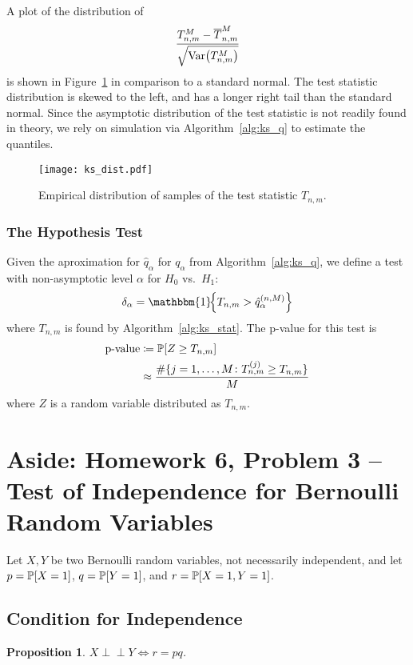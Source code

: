 \documentclass[letterpaper, reqno]{amsart}
\newtheorem{prop}{Proposition}[section]
\numberwithin{equation}{section}
\newcommand{\Prob}[1]{\mathbb{P}\mleft[#1\mright]}
\newcommand{\Var}[1]{\operatorname{Var}\mleft(#1\mright)}
\newcommand{\indep}{\perp \!\!\! \perp}  %
\newcommand{\indic}[1]{\mathbbm{1}\!\mleft\{#1\mright\}} %
\begin{document}
A plot of the distribution of 
\[ \frac{T_{n,m}^M - \overline{T}_{n,m}^M}{\sqrt{\Var{T_{n,m}^M}}} \]
is shown in Figure~\ref{fig:Tnm} in comparison to a standard normal. The test
statistic distribution is skewed to the left, and has a longer right tail than
the standard normal.
Since the asymptotic distribution of the test statistic is not readily found in
theory, we rely on simulation via Algorithm~\ref{alg:ks_q} to estimate the
quantiles.

\begin{figure}[!h]
  \centering
  \texttt{[image: ks\_dist.pdf]}
  \caption{Empirical distribution of samples of the test statistic $T_{n,m}$.}
  \label{fig:Tnm}
\end{figure}

\subsubsection{The Hypothesis Test}
Given the aproximation for $\hat{q}_\alpha$ for $q_\alpha$ from
Algorithm~\ref{alg:ks_q}, we define a test with non-asymptotic level $\alpha$
for $H_0$ vs.\ $H_1$:
\begin{equation}
  \delta_\alpha = \indic{T_{n,m} > \hat{q}_\alpha^{(n, M)}}
\end{equation}
where $T_{n,m}$ is found by Algorithm~\ref{alg:ks_stat}. The p-value for this
test is
\begin{align}
  \text{p-value} &\coloneqq \Prob{Z \ge T_{n,m}} \\
  &\approx \frac{\#\{j = 1, \dots, M \colon T_{n,m}^{(j)} \ge T_{n,m}\}}{M}
\end{align}
where $Z$ is a random variable distributed as $T_{n,m}$.

\clearpage
\section{Aside: Homework 6, Problem 3 -- Test of Independence for Bernoulli Random Variables}
Let $X, Y$ be two Bernoulli random variables, not necessarily independent, and
let $p = \Prob{X=1}$, $q = \Prob{Y=1}$, and $r = \Prob{X=1, Y=1}$.

\subsection{Condition for Independence}
\begin{prop}
  $X \indep Y \iff r = pq$.
\end{prop}
\end{document}
